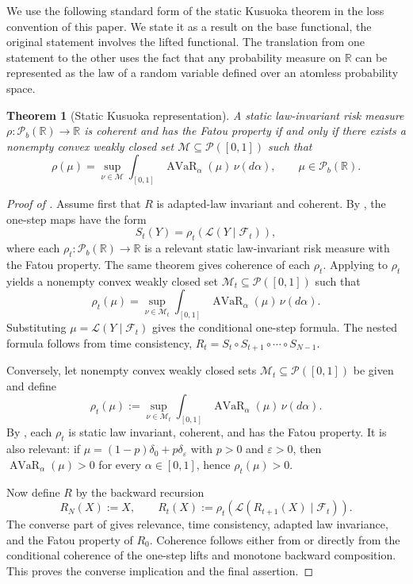 \documentclass[a4paper]{amsart}
\newtheorem{theorem}{Theorem}[section]
\theoremstyle{definition}
\DeclareMathOperator{\AVaR}{AVaR}
\newcommand{\R}{\mathbb{R}}
\newcommand{\F}{\mathcal{F}}
\newcommand{\law}{\mathcal{L}}
\newcommand{\Pc}{\mathcal P}
\renewcommand{\subset}{\subseteq}
\begin{document}
We use the following standard form of the static Kusuoka theorem in the loss
convention of this paper. We state it as a result on the base functional, the original statement \cite[Theorem 4]{Kusuoka2001} involves the lifted functional. The translation from one statement to the other uses the fact that any probability measure on $\R$ can be represented as the law of a random variable defined over an atomless probability space.

\begin{theorem}[Static Kusuoka representation]
\label{thm:static-kusuoka}
A static law-invariant risk measure \(\rho:\Pc_b(\R)\to\R\) is coherent and
has the Fatou property if and only if there exists a nonempty convex weakly
closed set \(\mathcal M\subset\Pc([0,1])\) such that
\[
\rho(\mu)
=
\sup_{\nu\in\mathcal M}
\int_{[0,1]}\AVaR_\alpha(\mu)\,\nu(d\alpha),
\qquad
\mu\in\Pc_b(\R).
\]
\end{theorem}

\begin{proof}[Proof of ]
Assume first that \(R\) is adapted-law invariant and coherent. By
, the one-step maps have the form
\[
S_t(Y)=\rho_t(\law(Y\mid\F_t)),
\]
where each \(\rho_t:\Pc_b(\R)\to\R\) is a relevant static law-invariant risk
measure with the Fatou property. The same theorem gives coherence of each
\(\rho_t\). Applying  to \(\rho_t\) yields a nonempty
convex weakly closed set \(\mathcal M_t\subset\Pc([0,1])\) such that
\[
\rho_t(\mu)
=
\sup_{\nu\in\mathcal M_t}
\int_{[0,1]}\AVaR_\alpha(\mu)\,\nu(d\alpha).
\]
Substituting \(\mu=\law(Y\mid\F_t)\) gives the conditional one-step formula.
The nested formula follows from time consistency,
\(R_t=S_t\circ S_{t+1}\circ\cdots\circ S_{N-1}\).

Conversely, let nonempty convex weakly closed sets
\(\mathcal M_t\subset\Pc([0,1])\) be given and define
\[
\rho_t(\mu)
:=
\sup_{\nu\in\mathcal M_t}
\int_{[0,1]}\AVaR_\alpha(\mu)\,\nu(d\alpha).
\]
By , each \(\rho_t\) is static law invariant,
coherent, and has the Fatou property. It is also relevant: if
\(\mu=(1-p)\delta_0+p\delta_\varepsilon\) with \(p>0\) and
\(\varepsilon>0\), then \(\AVaR_\alpha(\mu)>0\) for every
\(\alpha\in[0,1]\), hence \(\rho_t(\mu)>0\).

Now define \(R\) by the backward recursion
\[
R_N(X):=X,
\qquad
R_t(X):=\rho_t(\law(R_{t+1}(X)\mid\F_t)).
\]
The converse part of  gives relevance, time
consistency, adapted law invariance, and the Fatou property of \(R_0\).
Coherence follows either from  or directly from
the conditional coherence of the one-step lifts and monotone backward
composition. This proves the converse implication and the final assertion.
\end{proof}
\end{document}
